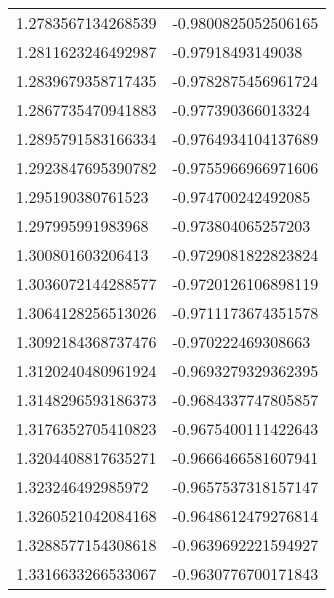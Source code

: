 \begin{supertabular}{ll}
1.2783567134268539  & -0.9800825052506165   \\
1.2811623246492987  & -0.97918493149038     \\
1.2839679358717435  & -0.9782875456961724   \\
1.2867735470941883  & -0.977390366013324    \\
1.2895791583166334  & -0.9764934104137689   \\
1.2923847695390782  & -0.9755966966971606   \\
1.295190380761523   & -0.974700242492085    \\
1.297995991983968   & -0.973804065257203    \\
1.300801603206413   & -0.9729081822823824   \\
1.3036072144288577  & -0.9720126106898119   \\
1.3064128256513026  & -0.9711173674351578   \\
1.3092184368737476  & -0.970222469308663    \\
1.3120240480961924  & -0.9693279329362395   \\
1.3148296593186373  & -0.9684337747805857   \\
1.3176352705410823  & -0.9675400111422643   \\
1.3204408817635271  & -0.9666466581607941   \\
1.323246492985972   & -0.9657537318157147   \\
1.3260521042084168  & -0.9648612479276814   \\
1.3288577154308618  & -0.9639692221594927   \\
1.3316633266533067  & -0.9630776700171843   \\
\end{supertabular}
